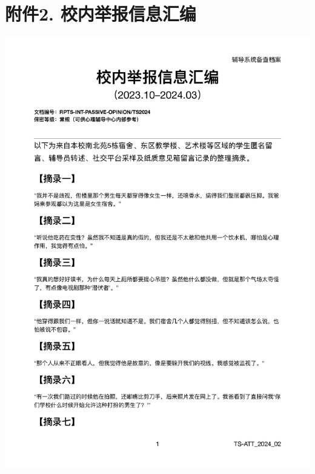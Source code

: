 \documentclass[]{ctexrep}
\begin{document}
	\section*{附件2. 校内举报信息汇编}
	\includegraphics[scale=0.6]{./附件2正文_页面_1.png}
	
\end{document}
